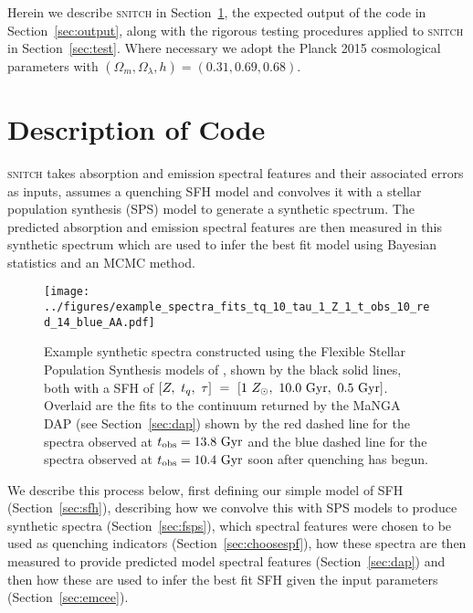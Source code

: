 \documentclass[useAMS,usenatbib]{mn2e}
\begin{document}


Herein we describe \textsc{snitch} in Section~\hyperref[sec:code]{\ref*{sec:code}}, the expected output of the code in Section~\ref{sec:output}, along with the rigorous testing procedures applied to \textsc{snitch} in Section~\ref{sec:test}. Where necessary we adopt the Planck 2015 \citep{planck16} cosmological parameters with $(\Omega_m, \Omega_{\lambda}, h) = (0.31, 0.69, 0.68)$. 

\section{Description of Code}\label{sec:code}

\textsc{snitch} takes absorption and emission spectral features and their associated errors as inputs, assumes a quenching SFH model and convolves it with a stellar population synthesis (SPS) model to generate a synthetic spectrum. The predicted absorption and emission spectral features are then measured in this synthetic spectrum which are used to infer the best fit model using Bayesian statistics and an MCMC method. 

\begin{figure*}
\centering
\texttt{[image: ../figures/example\_spectra\_fits\_tq\_10\_tau\_1\_Z\_1\_t\_obs\_10\_red\_14\_blue\_AA.pdf]}
\caption{Example synthetic spectra constructed using the Flexible Stellar Population Synthesis models of \citeauthor[][see Section~\ref{sec:fsps}]{conroy09}, shown by the black solid lines, both with a SFH of $[Z,~t_q,~\tau]~=~[1~Z_{\odot},~10.0~\rm{Gyr},~0.5~\rm{Gyr}]$. Overlaid are the fits to the continuum returned by the MaNGA DAP (see Section~\ref{sec:dap}) shown by the red dashed line for the spectra observed at $t_{\rm{obs}} = 13.8~\rm{Gyr}$ and the blue dashed line for the spectra observed at $t_{\rm{obs}} = 10.4~\rm{Gyr}$ soon after quenching has begun.}
\label{fig:spectrafit}
\end{figure*}

We describe this process below, first defining our simple model of SFH (Section~\ref{sec:sfh}), describing how we convolve this with SPS models to produce synthetic spectra (Section~\ref{sec:fsps}), which spectral features were chosen to be used as quenching indicators (Section~\ref{sec:choosespf}), how these spectra are then measured to provide predicted model spectral features (Section~\ref{sec:dap}) and then how these are used to infer the best fit SFH given the input parameters (Section~\ref{sec:emcee}). 
\end{document}
